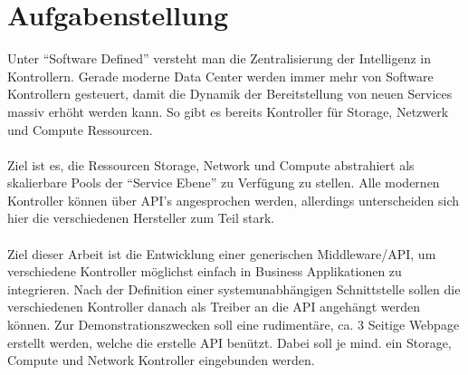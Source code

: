 

\chapter{Aufgabenstellung}

Unter ``Software Defined'' versteht man die Zentralisierung der Intelligenz in Kontrollern. 
Gerade moderne Data Center werden immer mehr von Software Kontrollern gesteuert, 
damit die Dynamik der Bereitstellung von neuen Services massiv erhöht werden kann. 
So gibt es bereits Kontroller für Storage, Netzwerk und Compute Ressourcen. 
\\ \\
Ziel ist es, die Ressourcen Storage, Network und Compute abstrahiert als skalierbare Pools der 
``Service Ebene'' zu Verfügung zu stellen. Alle modernen Kontroller können über API's 
angesprochen werden, allerdings unterscheiden sich hier die verschiedenen Hersteller zum Teil stark.
\\ \\
Ziel dieser Arbeit ist die Entwicklung einer generischen Middleware/API, um verschiedene Kontroller 
möglichst einfach in Business Applikationen zu integrieren. Nach der Definition einer systemunabhängigen 
Schnittstelle sollen die verschiedenen Kontroller danach als Treiber an die API angehängt werden können. 
Zur Demonstrationszwecken soll eine rudimentäre, ca. 3 Seitige Webpage erstellt werden, welche die erstelle 
API benützt. Dabei soll je mind. ein Storage, Compute und Network Kontroller eingebunden werden.

